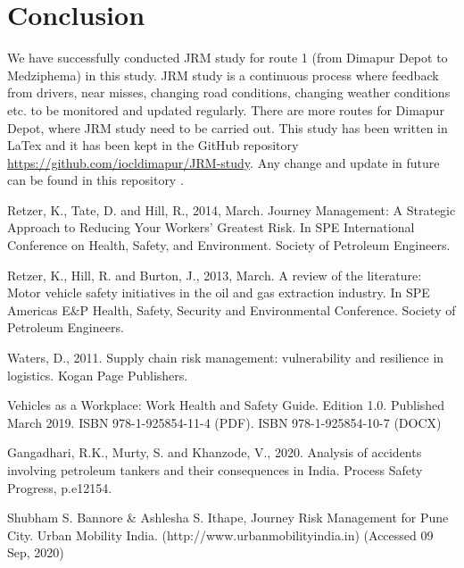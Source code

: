\documentclass[paper=letter, fontsize=12pt]{article}
\begin{document}
\section{Conclusion}

We have successfully conducted JRM study for route 1 (from Dimapur Depot to Medziphema) in this study. JRM study is a continuous process where feedback from drivers, near misses, changing road conditions, changing weather conditions etc. to be monitored and updated regularly. There are more routes for Dimapur Depot, where JRM study need to be carried out. This study has been written in LaTex and it has been kept in the GitHub repository \href{https://github.com/iocldimapur/JRM-study}{https://github.com/iocldimapur/JRM-study}. Any change and update in future can be found in this repository .


\begin{thebibliography}{9}

Retzer, K., Tate, D. and Hill, R., 2014, March. Journey Management: A Strategic Approach to Reducing Your Workers' Greatest Risk. In SPE International Conference on Health, Safety, and Environment. Society of Petroleum Engineers.

Retzer, K., Hill, R. and Burton, J., 2013, March. A review of the literature: Motor vehicle safety initiatives in the oil and gas extraction industry. In SPE Americas E&P Health, Safety, Security and Environmental Conference. Society of Petroleum Engineers.

Waters, D., 2011. Supply chain risk management: vulnerability and resilience in logistics. Kogan Page Publishers.

Vehicles as a Workplace: Work Health and Safety Guide. Edition 1.0. Published March 2019. ISBN 978-1-925854-11-4 (PDF). ISBN 978-1-925854-10-7 (DOCX)

Gangadhari, R.K., Murty, S. and Khanzode, V., 2020. Analysis of accidents involving petroleum tankers and their consequences in India. Process Safety Progress, p.e12154.

Shubham S. Bannore & Ashlesha S. Ithape, Journey Risk Management for Pune City. Urban Mobility India. (http://www.urbanmobilityindia.in) (Accessed 09 Sep, 2020)


\end{thebibliography}




\end{document}
